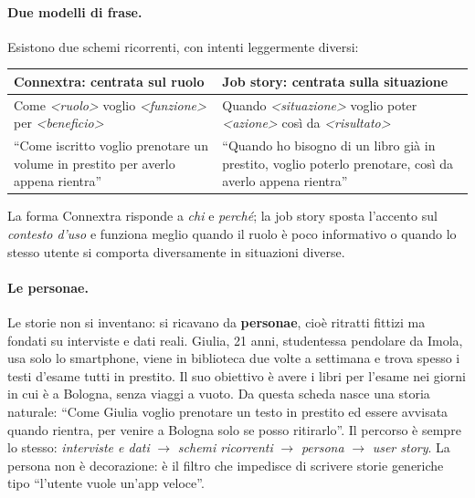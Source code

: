 \documentclass[12pt]{extarticle}
\begin{document}
\paragraph{Due modelli di frase.}
Esistono due schemi ricorrenti, con intenti leggermente diversi:

\begin{center}
\small
\begin{tabular}{p{7.4cm}p{7.4cm}}
    \toprule
    \textbf{Connextra: centrata sul ruolo} & \textbf{Job story: centrata sulla situazione} \\
    \midrule
    Come \textit{<ruolo>} voglio \textit{<funzione>} per \textit{<beneficio>} & Quando \textit{<situazione>} voglio poter \textit{<azione>} così da \textit{<risultato>} \\
    \addlinespace
    ``Come iscritto voglio prenotare un volume in prestito per averlo appena rientra'' & ``Quando ho bisogno di un libro già in prestito, voglio poterlo prenotare, così da averlo appena rientra'' \\
    \bottomrule
\end{tabular}
\end{center}

\noindent La forma Connextra risponde a \textit{chi} e \textit{perché}; la job story sposta l'accento sul \textit{contesto d'uso} e funziona meglio quando il ruolo è poco informativo o quando lo stesso utente si comporta diversamente in situazioni diverse.

\paragraph{Le personae.}
Le storie non si inventano: si ricavano da \textbf{personae}, cioè ritratti fittizi ma fondati su interviste e dati reali. Giulia, 21 anni, studentessa pendolare da Imola, usa solo lo smartphone, viene in biblioteca due volte a settimana e trova spesso i testi d'esame tutti in prestito. Il suo obiettivo è avere i libri per l'esame nei giorni in cui è a Bologna, senza viaggi a vuoto. Da questa scheda nasce una storia naturale: ``Come Giulia voglio prenotare un testo in prestito ed essere avvisata quando rientra, per venire a Bologna solo se posso ritirarlo''. Il percorso è sempre lo stesso: \textit{interviste e dati} $\rightarrow$ \textit{schemi ricorrenti} $\rightarrow$ \textit{persona} $\rightarrow$ \textit{user story}. La persona non è decorazione: è il filtro che impedisce di scrivere storie generiche tipo ``l'utente vuole un'app veloce''.
\end{document}
